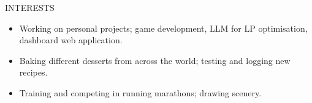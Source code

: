 
\begin{ResumeSection}{INTERESTS}
    \begin{itemize}
        \item Working on personal projects; game development, LLM for LP optimisation, dashboard web application.
        \vspace{-0.5em}
        \item Baking different desserts from across the world; testing and logging new recipes.
        \vspace{-0.5em}
        \item Training and competing in running marathons; drawing scenery.
    \end{itemize} 
\end{ResumeSection}
